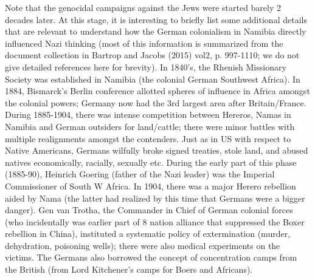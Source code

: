 Note that the genocidal campaigns against the Jews were started barely 2 decades later. At this stage, it is interesting to briefly list some additional details that are relevant to understand how the German colonialism in Namibia directly influenced Nazi thinking (most of this information is summarized from the document collection in Bartrop and Jacobs (2015) vol2, p. 997-1110; we do not give detailed references here for brevity). In 1840’s, the Rhenish Missionary Society was established in Namibia (the colonial German Southwest Africa). In 1884, Bismarck’s Berlin conference allotted spheres of influence in Africa amongst the colonial powers; Germany now had the 3rd largest area after Britain/France. During 1885-1904, there was intense competition between Hereros, Namas in Namibia and German outsiders for land/cattle; there were minor battles with multiple realignments amongst the contenders. Just as in US with respect to Native Americans, Germans wilfully broke signed treaties, stole land, and abused natives economically, racially, sexually etc. During the early part of this phase (1885-90), Heinrich Goering (father of the Nazi leader) was the Imperial Commissioner of South W Africa. In 1904, there was a major Herero rebellion aided by Nama (the latter had realized by this time that Germans were a bigger danger). Gen van Trotha, the Commander in Chief of German colonial forces (who incidentally was earlier part of 8 nation alliance that suppressed the Boxer rebellion in China), instituted a systematic policy of extermination (murder, dehydration, poisoning wells); there were also medical experiments on the victims. The Germans also borrowed the concept of concentration camps from the British (from Lord Kitchener's camps for Boers and Africans).

